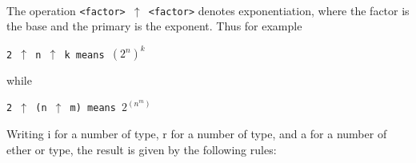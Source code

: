 \documentclass[a4paper,11pt]{article}
\begin{document}
\paragraph{} \label{LblOperatorsAndTypesP3}
The operation \texttt{<factor> $\uparrow$ <factor>} denotes
exponentiation, where the factor is the base and the primary is the
exponent.  Thus for example

\begin{flushleft}
\texttt{2 $\uparrow$ n $\uparrow$ k means $(2^n)^k$}\\
\end{flushleft}

while

\begin{flushleft}
\texttt{2 $\uparrow$ (n $\uparrow$ m)  means  $2^{(n^m)}$}\\
\end{flushleft}


Writing i for a number of  type, r for a number of
 type, and a for a number of ether  or
 type, the result is given by the following rules:
\end{document}
